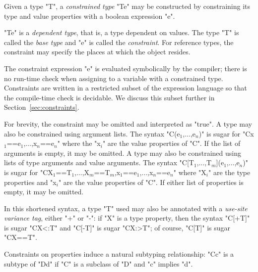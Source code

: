 
        Given a type \xcd"T", a {\em constrained type}
        \xcd"T{e}" may be
        constructed by constraining its
        \iftypeparams\else
        type and value
        \fi
        properties with a
        boolean expression \xcd"e".

        \xcd"T{e}" is a {\em dependent type}, that is, a type
        dependent on values.
        The type \xcd"T" is called the
        {\em base type} and \xcd"e" is called the {\em constraint}.
        For reference types, the constraint may
        specify the places at which the object resides.

        The constraint expression \xcd"e" is evaluated symbolically by the
        compiler; there is no run-time check when assigning to a
        variable with a constrained type.  Constraints are
        written in a restricted subset of the expression
        language so that the compile-time check is decidable.
        We discuss this subset further in
        Section~\ref{sec:constraints}.

For brevity, the constraint may be omitted and
interpreted as \xcd"true".
\iftypeparams
A type may also be constrained using argument lists.
The syntax 
\xcdmath"C(e$_1$,$\dots$,e$_n$)" is sugar for
\xcdmath"C{x$_1$==e$_1$,$\dots$,x$_n$==e$_n$}"
where the \xcdmath"x$_i$" are the
value properties of \xcd"C".  
If the list of arguments is empty, it may be omitted.
\else
A type may also be constrained using lists of type arguments and
value arguments.
The syntax 
\xcdmath"C[T$_1$,$\dots$,T$_m$](e$_1$,$\dots$,e$_n$)" is sugar for
\xcdmath"C{X$_1$==T$_1$,$\dots$,X$_m$==T$_m$,x$_1$==e$_1$,$\dots$,x$_n$==e$_n$}"
where \xcdmath"X$_i$" are the type properties and \xcdmath"x$_i$" are the
value properties of \xcd"C".  
If either list of properties is empty, it may be omitted.
\fi

\iftypeparams\else
In this shortened syntax, a type \xcd"T" used may also be annotated
with
a \emph{use-site variance tag}, either \xcd"+" or \xcd"-":
if \xcd"X" is a type property, then
the syntax \xcd"C[+T]" is sugar \xcd"C{X<:T}" and
\xcd"C[-T]" is sugar \xcd"C{X:>T}"; of course,
\xcd"C[T]" is sugar \xcd"C{X==T}".
\fi
\fi

Constraints on properties induce a natural subtyping relationship:
\xcd"C{c}" is a subtype of
\xcd"D{d}" if \xcd"C" is a subclass of \xcd"D" and
\xcd"c" implies \xcd"d".


